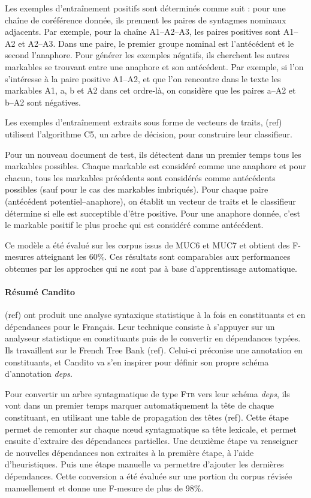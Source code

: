 \documentclass[a4paper,12pt]{article}
\begin{document}
Les exemples d'entra\^inement positifs sont déterminés comme suit : pour une cha\^ine de coréférence donnée, ils prennent les paires de syntagmes nominaux adjacents. Par exemple, pour la cha\^ine A1--A2--A3, les paires positives sont A1--A2 et A2--A3. Dans une paire, le premier groupe nominal est l'antécédent et le second l'anaphore. Pour générer les exemples négatifs, ils cherchent les autres markables se trouvant entre une anaphore et son antécédent. Par exemple, si l'on s'intéresse à la paire positive A1--A2, et que l'on rencontre dans le texte les markables A1, a, b et A2 dans cet ordre-là, on considère que les paires a--A2 et b--A2 sont négatives.

Les exemples d'entra\^inement extraits sous forme de vecteurs de traits, (ref) utilisent l'algorithme C5, un arbre de décision, pour construire leur classifieur.

Pour un nouveau document de test, ils détectent dans un premier temps tous les markables possibles. Chaque markable est considéré comme une anaphore et pour chacun, tous les markables précédents sont considérés comme antécédents possibles (sauf pour le cas des markables imbriqués). Pour chaque paire (antécédent potentiel--anaphore), on établit un vecteur de traits et le classifieur détermine si elle est succeptible d'\^etre positive. Pour une anaphore donnée, c'est le markable positif le plus proche qui est considéré comme antécédent.

Ce modèle a été évalué sur les corpus issus de MUC6 et MUC7 et obtient des F-mesures atteignant les 60\%. Ces résultats sont comparables aux performances obtenues par les approches qui ne sont pas à base d'apprentissage automatique.

\paragraph{Résumé Candito}
(ref) ont produit une analyse syntaxique statistique à la fois en constituants et en dépendances pour le Français. Leur technique consiste à s'appuyer sur un analyseur statistique en constituants puis de le convertir en dépendances typées. Ils travaillent sur le French Tree Bank (ref). Celui-ci préconise une annotation en constituants, et Candito va s'en inspirer pour définir son propre schéma d'annotation \textit{deps}. 

Pour convertir un arbre syntagmatique de type \textsc{Ftb} vers leur schéma \textit{deps}, ils vont dans un premier temps marquer automatiquement la tête de chaque constituant, en utilisant une table de propagation des têtes (ref). Cette étape permet de remonter sur chaque n\oe{}ud syntagmatique sa tête lexicale, et permet ensuite d'extraire des dépendances partielles. Une deuxième étape va renseigner de nouvelles dépendances non extraites à la première étape, à l'aide d'heuristiques. Puis une étape manuelle va permettre d'ajouter les dernières dépendances. Cette conversion a été évaluée sur une portion du corpus révisée manuellement et donne une F-mesure de plus de 98\%.
\end{document}
